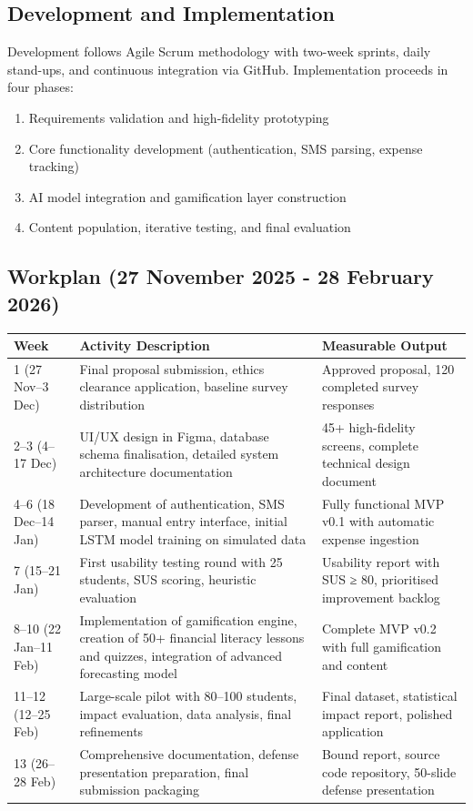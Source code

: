 \documentclass[12pt]{article}
\begin{document}
\subsection{\large Development and Implementation}
Development follows Agile Scrum methodology with two-week sprints, daily stand-ups, and continuous integration via GitHub. Implementation proceeds in four phases:
\begin{enumerate}
    \item Requirements validation and high-fidelity prototyping
    \item Core functionality development (authentication, SMS parsing, expense tracking)
    \item AI model integration and gamification layer construction
    \item Content population, iterative testing, and final evaluation
\end{enumerate}

\subsection{\large Workplan (27 November 2025 - 28 February 2026)}

\begin{center}
\begin{tabular}{|p{2.8cm}|p{7.5cm}|p{6cm}|}
\hline
\textbf{\large Week} & \textbf{\large Activity Description} & \textbf{\large Measurable Output} \\
\hline
1 (27 Nov--3 Dec) & Final proposal submission, ethics clearance application, baseline survey distribution & Approved proposal, 120 completed survey responses \\
\hline
2--3 (4--17 Dec) & UI/UX design in Figma, database schema finalisation, detailed system architecture documentation & 45+ high-fidelity screens, complete technical design document \\
\hline
4--6 (18 Dec--14 Jan) & Development of authentication, SMS parser, manual entry interface, initial LSTM model training on simulated data & Fully functional MVP v0.1 with automatic expense ingestion \\
\hline
7 (15--21 Jan) & First usability testing round with 25 students, SUS scoring, heuristic evaluation & Usability report with SUS ≥ 80, prioritised improvement backlog \\
\hline
8--10 (22 Jan--11 Feb) & Implementation of gamification engine, creation of 50+ financial literacy lessons and quizzes, integration of advanced forecasting model & Complete MVP v0.2 with full gamification and content \\
\hline
11--12 (12--25 Feb) & Large-scale pilot with 80--100 students, impact evaluation, data analysis, final refinements & Final dataset, statistical impact report, polished application \\
\hline
13 (26--28 Feb) & Comprehensive documentation, defense presentation preparation, final submission packaging & Bound report, source code repository, 50-slide defense presentation \\
\hline
\end{tabular}
\end{center}
\end{document}
